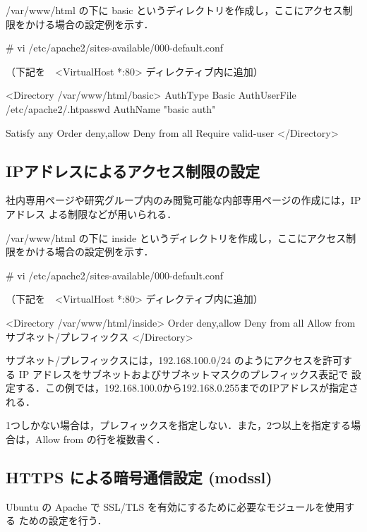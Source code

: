 /var/www/html の下に basic というディレクトリを作成し，ここにアクセス制
限をかける場合の設定例を示す．

\begin{cli}
# vi /etc/apache2/sites-available/000-default.conf

（下記を　<VirtualHost *:80> ディレクティブ内に追加）

<Directory /var/www/html/basic>
        AuthType Basic
        AuthUserFile /etc/apache2/.htpasswd
        AuthName "basic auth"
        
        Satisfy any
        Order deny,allow
        Deny from all
        Require valid-user
</Directory>
\end{cli}

\subsection{IPアドレスによるアクセス制限の設定}

社内専用ページや研究グループ内のみ閲覧可能な内部専用ページの作成には，IPアドレス
よる制限などが用いられる．

/var/www/html の下に inside というディレクトリを作成し，ここにアクセス制
限をかける場合の設定例を示す．

\begin{cli}
# vi /etc/apache2/sites-available/000-default.conf

（下記を　<VirtualHost *:80> ディレクティブ内に追加）

<Directory /var/www/html/inside>
        Order deny,allow
        Deny from all
        Allow from サブネット/プレフィックス
</Directory>
\end{cli}

サブネット/プレフィックスには，192.168.100.0/24 のようにアクセスを許可す
る IP アドレスをサブネットおよびサブネットマスクのプレフィックス表記で
設定する．この例では，192.168.100.0から192.168.0.255までのIPアドレスが指定される．

1つしかない場合は，プレフィックスを指定しない．また，2つ以上を指定する場合は，Allow from の行を複数書く．




\subsection{HTTPS による暗号通信設定 (modssl)}

Ubuntu の Apache で SSL/TLS を有効にするために必要なモジュールを使用する
ための設定を行う．

